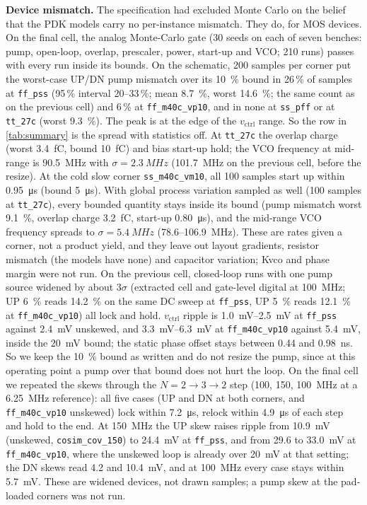 \documentclass[10pt,twocolumn,letterpaper]{article}
\newcommand{\code}[1]{\texttt{\small #1}}
\begin{document}
\textbf{Device mismatch.} The specification had excluded Monte Carlo on the
belief that the PDK models carry no per-instance mismatch. They do, for MOS
devices. On the final cell,
the analog Monte-Carlo gate (30 seeds on each of seven benches: pump,
open-loop, overlap, prescaler, power, start-up and VCO; 210 runs) passes
with every run inside its bounds. On the schematic, 200 samples per corner put the worst-case UP/DN
pump mismatch over its \SI{10}{\%} bound in 26\,\% of samples at \code{ff\_pss}
(95\,\% interval 20--33\,\%; mean \SI{8.7}{\%}, worst \SI{14.6}{\%}; the same count as on the previous cell) and 6\,\% at
\code{ff\_m40c\_vp10}, and in none at \code{ss\_pff} or at \code{tt\_27c} (worst \SI{9.3}{\%}). The
peak is at the edge of the $v_\text{ctrl}$ range. So the row in
\cref{tab:summary} is the spread with statistics off. At \code{tt\_27c} the
overlap charge (worst \SI{3.4}{fC}, bound \SI{10}{fC}) and bias start-up hold;
the VCO frequency at mid-range is \SI{90.5}{MHz} with $\sigma=\SI{2.3}{MHz}$ (\SI{101.7}{MHz} on the previous cell, before the resize).
At the cold slow corner \code{ss\_m40c\_vm10}, all 100 samples start up within
\SI{0.95}{\micro s} (bound \SI{5}{\micro s}).
With global process variation sampled as well (100 samples at
\code{tt\_27c}), every bounded quantity stays inside its bound (pump
mismatch worst \SI{9.1}{\%}, overlap charge \SI{3.2}{fC}, start-up
\SI{0.80}{\micro s}), and the mid-range VCO frequency spreads to
$\sigma=\SI{5.4}{MHz}$ (78.6--\SI{106.9}{MHz}).
These are rates given a corner, not a product yield, and they leave out layout
gradients, resistor mismatch (the models have none) and capacitor variation;
Kvco and phase margin were not run. On the previous cell, closed-loop runs with one pump source widened by about $3\sigma$ (extracted cell
and gate-level digital at \SI{100}{MHz}; UP \SI{+6}{\%} reads \SI{14.2}{\%} on the
same DC sweep at \code{ff\_pss}, UP \SI{+5}{\%} reads \SI{12.1}{\%} at
\code{ff\_m40c\_vp10}) all lock and hold. $v_\text{ctrl}$ ripple is \SIrange{1.0}{2.5}{mV}
at \code{ff\_pss} against \SI{2.4}{mV} unskewed, and \SIrange{3.3}{6.3}{mV} at
\code{ff\_m40c\_vp10} against \SI{5.4}{mV}, inside the \SI{20}{mV} bound; the static phase
offset stays between 0.44 and \SI{0.98}{ns}. So we keep the \SI{10}{\%} bound as written and do not
resize the pump, since at this operating point a pump over that bound does not hurt the loop.
On the final cell we repeated the skews through the $N=2\to3\to2$ step
(100, 150, \SI{100}{MHz} at a \SI{6.25}{MHz} reference): all five cases (UP
and DN at both corners, and \code{ff\_m40c\_vp10} unskewed) lock within
\SI{7.2}{\micro s}, relock within \SI{4.9}{\micro s} of each step and hold to
the end. At \SI{150}{MHz} the UP skew raises ripple from \SI{10.9}{mV}
(unskewed, \code{cosim\_cov\_150}) to \SI{24.4}{mV} at \code{ff\_pss}, and from
29.6 to \SI{33.0}{mV} at \code{ff\_m40c\_vp10}, where the unskewed loop is
already over \SI{20}{mV} at that setting; the DN skews read 4.2 and
\SI{10.4}{mV}, and at \SI{100}{MHz} every case stays within
\SI{5.7}{mV}. These are widened devices, not drawn samples; a pump skew at
the pad-loaded corners was not run.
\end{document}
